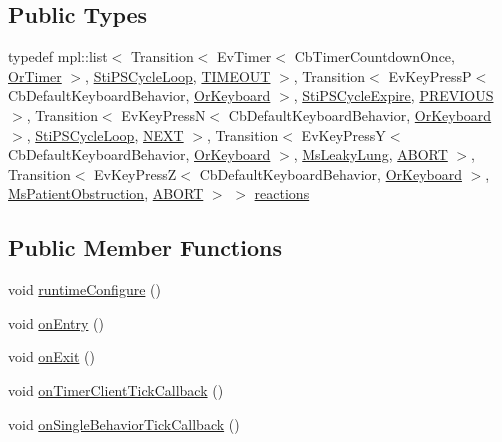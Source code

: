 \subsection*{Public Types}
\begin{DoxyCompactItemize}
\item 
typedef mpl\+::list$<$ Transition$<$ Ev\+Timer$<$ Cb\+Timer\+Countdown\+Once, \hyperlink{classsm__respira__1_1_1OrTimer}{Or\+Timer} $>$, \hyperlink{structsm__respira__1_1_1cmv__cycle__inner__states_1_1StiPSCycleLoop}{Sti\+P\+S\+Cycle\+Loop}, \hyperlink{structsm__respira__1_1_1cmv__cycle__inner__states_1_1StiPSCycleDwell_1_1TIMEOUT}{T\+I\+M\+E\+O\+UT} $>$, Transition$<$ Ev\+Key\+PressP$<$ Cb\+Default\+Keyboard\+Behavior, \hyperlink{classsm__respira__1_1_1OrKeyboard}{Or\+Keyboard} $>$, \hyperlink{structsm__respira__1_1_1cmv__cycle__inner__states_1_1StiPSCycleExpire}{Sti\+P\+S\+Cycle\+Expire}, \hyperlink{structsm__respira__1_1_1cmv__cycle__inner__states_1_1StiPSCycleDwell_1_1PREVIOUS}{P\+R\+E\+V\+I\+O\+US} $>$, Transition$<$ Ev\+Key\+PressN$<$ Cb\+Default\+Keyboard\+Behavior, \hyperlink{classsm__respira__1_1_1OrKeyboard}{Or\+Keyboard} $>$, \hyperlink{structsm__respira__1_1_1cmv__cycle__inner__states_1_1StiPSCycleLoop}{Sti\+P\+S\+Cycle\+Loop}, \hyperlink{structsm__respira__1_1_1cmv__cycle__inner__states_1_1StiPSCycleDwell_1_1NEXT}{N\+E\+XT} $>$, Transition$<$ Ev\+Key\+PressY$<$ Cb\+Default\+Keyboard\+Behavior, \hyperlink{classsm__respira__1_1_1OrKeyboard}{Or\+Keyboard} $>$, \hyperlink{classsm__respira__1_1_1MsLeakyLung}{Ms\+Leaky\+Lung}, \hyperlink{classABORT}{A\+B\+O\+RT} $>$, Transition$<$ Ev\+Key\+PressZ$<$ Cb\+Default\+Keyboard\+Behavior, \hyperlink{classsm__respira__1_1_1OrKeyboard}{Or\+Keyboard} $>$, \hyperlink{classsm__respira__1_1_1MsPatientObstruction}{Ms\+Patient\+Obstruction}, \hyperlink{classABORT}{A\+B\+O\+RT} $>$ $>$ \hyperlink{structsm__respira__1_1_1cmv__cycle__inner__states_1_1StiPSCycleDwell_a393e74db3d401609684a11fb37bd23ce}{reactions}
\end{DoxyCompactItemize}
\subsection*{Public Member Functions}
\begin{DoxyCompactItemize}
\item 
void \hyperlink{structsm__respira__1_1_1cmv__cycle__inner__states_1_1StiPSCycleDwell_a1cbdbf655b548f4999c36faef3ba0528}{runtime\+Configure} ()
\item 
void \hyperlink{structsm__respira__1_1_1cmv__cycle__inner__states_1_1StiPSCycleDwell_a4d68bfae4c76af28ef00ccea5574264d}{on\+Entry} ()
\item 
void \hyperlink{structsm__respira__1_1_1cmv__cycle__inner__states_1_1StiPSCycleDwell_abb2351562e886e92a3ca4d8b04f502bf}{on\+Exit} ()
\item 
void \hyperlink{structsm__respira__1_1_1cmv__cycle__inner__states_1_1StiPSCycleDwell_afe30abee5a61aa4c170db555ec7e2697}{on\+Timer\+Client\+Tick\+Callback} ()
\item 
void \hyperlink{structsm__respira__1_1_1cmv__cycle__inner__states_1_1StiPSCycleDwell_ae7223830d6879b3b7c35e072ed98b365}{on\+Single\+Behavior\+Tick\+Callback} ()
\end{DoxyCompactItemize}

